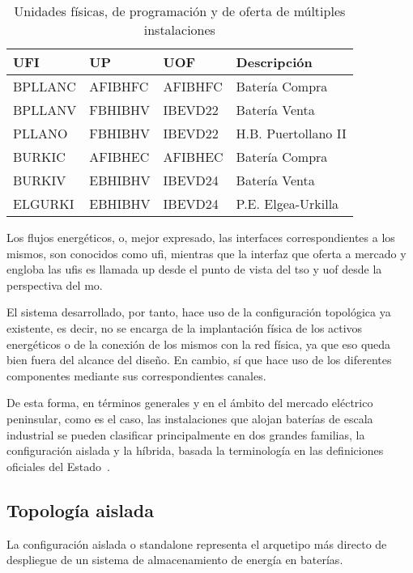 \begin{table}[ht]
  \centering
  \begin{tabular}{|l|l|l|l|}
    \hline
    UFI     & UP      & UOF    & Descripción\\
    \hline
    BPLLANC & AFIBHFC & AFIBHFC & Batería Compra\\
    BPLLANV & FBHIBHV & IBEVD22 & Batería Venta\\
    PLLANO  & FBHIBHV & IBEVD22 & H.B. Puertollano II\\
    BURKIC  & AFIBHEC & AFIBHEC & Batería Compra\\
    BURKIV  & EBHIBHV & IBEVD24 & Batería Venta\\
    ELGURKI & EBHIBHV & IBEVD24 & P.E. Elgea-Urkilla\\
    \hline
  \end{tabular}
  \caption{Unidades físicas, de programación y de oferta de múltiples instalaciones}
  \label{tab:unidades-fisicas}
\end{table}

Los flujos energéticos, o, mejor expresado, las interfaces correspondientes a los mismos, son conocidos como \gls{ufi}, mientras que la interfaz que oferta a mercado y engloba las \glspl{ufi} es llamada \gls{up} desde el punto de vista del \gls{tso} y \gls{uof} desde la perspectiva del \gls{mo}.

El sistema desarrollado, por tanto, hace uso de la configuración topológica ya existente, es decir, no se encarga de la implantación física de los activos energéticos o de la conexión de los mismos con la red física, ya que eso queda bien fuera del alcance del diseño. En cambio, sí que hace uso de los diferentes componentes mediante sus correspondientes canales.

De esta forma, en términos generales y en el ámbito del mercado eléctrico peninsular, como es el caso, las instalaciones que alojan baterías de escala industrial se pueden clasificar principalmente en dos grandes familias, la configuración aislada y la híbrida, basada la terminología en las definiciones oficiales del Estado~\cite{cnmc202403resolucion}.

\subsection{Topología aislada}
\label{makereference3.1.1}

La configuración aislada o standalone representa el arquetipo más directo de despliegue de un sistema de almacenamiento de energía en baterías.


